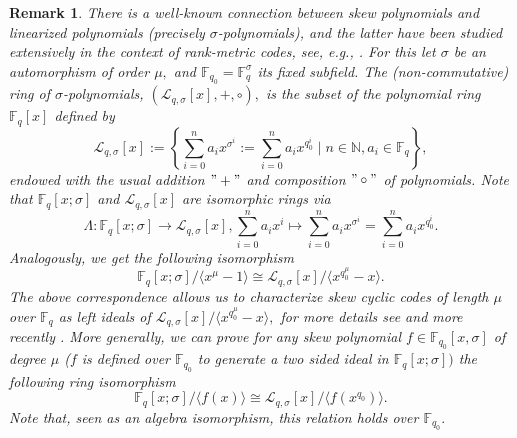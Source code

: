 \documentclass[12pt,paper]{article}
\newcommand{\hlc}[2][yellow]{ {\sethlcolor{#1} \hl{#2}} }
\theoremstyle{plain}
\newtheorem{remark}[theorem]{Remark}
\newcommand{\Fq}{\mathbb{F}_{q}}
\begin{document}
\begin{remark}
There is a well-known connection between skew polynomials and linearized polynomials (precisely $\sigma$-polynomials), and the latter have been studied extensively in the context of rank-metric codes, see, e.g.,
\cite{Gabidulin1985,ko08,ore1933special,wu2013linearized}. 
For this let $\sigma$ be an automorphism of order $\mu,$ and $\mathbb{F}_{q_0}=\Fq^{\sigma}$ its fixed subfield.
The (non-commutative) ring of   $\sigma$-polynomials, $ (\mathcal{L}_{q,\sigma}[x],+,\circ),$  is  the subset  of the polynomial ring $\Fq[x]$ defined by
$$
\mathcal{L}_{q,\sigma}[x]:=\left\{\sum_{i=0}^n a_i x^{\sigma^i} := \sum_{i=0}^n a_i x^{q_0^{i}}\mid n \in \mathbb{N}, a_i \in \Fq \right\},
$$
endowed with  the usual addition $"+"$ and  composition $"\circ"$ of polynomials. Note that  $\Fq[x ; \sigma]$ and $\mathcal{L}_{q,\sigma}[x]$ are
isomorphic rings %
via 
$$
\Lambda: \Fq[x ; \sigma] \longrightarrow \mathcal{L}_{q,\sigma}[x], \sum_{i=0}^n a_i x^i \longmapsto \sum_{i=0}^n a_i x^{\sigma^i}=\sum_{i=0}^n a_i x^{q_0^{i}} .
$$
Analogously, we get the following isomorphism 
$$ \Fq[x ; \sigma]/\langle x^{\mu}-1\rangle \cong \mathcal{L}_{q,\sigma}[x]/\langle x^{q_0^{\mu}}-x\rangle .$$ %
The above correspondence allows us to characterize skew cyclic codes of length $\mu $ over $ \Fq$ as left ideals of $\mathcal{L}_{q,\sigma}[x]/\langle x^{q_0^{\mu}}-x\rangle,$ for more details see \cite{gabidulin2009rank} and more recently \cite[Section 2.4]{martinez2017roots}. More generally, we can prove 
for any  skew polynomial $f \in \mathbb{F}_{q_0}[x,\sigma]$ of degree $ \mu$  ($f$ is defined over $\mathbb F_{q_0}$ to generate a two sided ideal in $\Fq[x;\sigma])$ the following   ring isomorphism 
$$ \Fq[x ; \sigma]/\langle f(x)\rangle \cong \mathcal{L}_{q,\sigma}[x]/\langle f(x^{q_0}) \rangle.$$ 
Note that, seen as an algebra isomorphism, this relation holds over $ \mathbb{F}_{q_0}.$

\end{remark}
\end{document}
